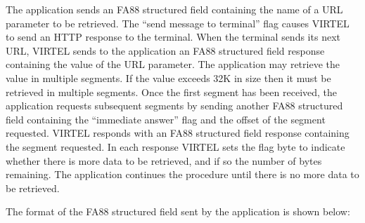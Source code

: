 \documentclass[letterpaper,10pt,english]{sphinxmanual}
\begin{document}
The application sends an FA88 structured field containing the name of a URL parameter to be retrieved. The “send
message to terminal” flag causes VIRTEL to send an HTTP response to the terminal. When the terminal sends its next
URL, VIRTEL sends to the application an FA88 structured field response containing the value of the URL parameter. The
application may retrieve the value in multiple segments. If the value exceeds 32K in size then it must be retrieved in
multiple segments. Once the first segment has been received, the application requests subsequent segments by
sending another FA88 structured field containing the “immediate answer” flag and the offset of the segment
requested. VIRTEL responds with an FA88 structured field response containing the segment requested. In each
response VIRTEL sets the flag byte to indicate whether there is more data to be retrieved, and if so the number of
bytes remaining. The application continues the procedure until there is no more data to be retrieved.

The format of the FA88 structured field sent by the application is shown below:

\begin{sphinxVerbatim}[commandchars=\\\{\}]
          
        
   
   
           
             
       
       
      
      
\end{sphinxVerbatim}
\end{document}
